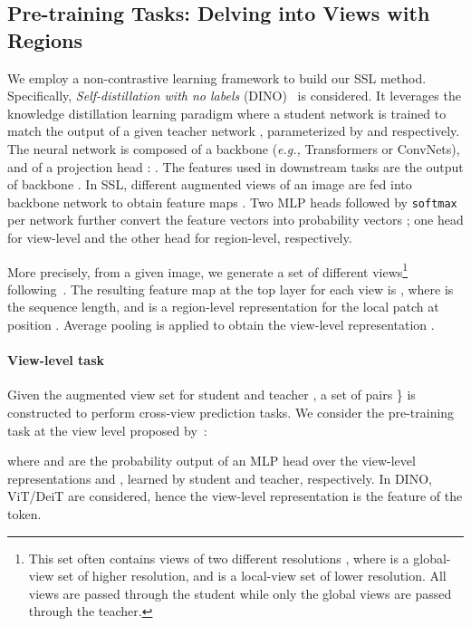 \documentclass{article} \usepackage{iclr2022_conference,times}
\newcommand{\eg}[0]{\emph{e.g., }}
\begin{document}
\subsection{Pre-training Tasks: Delving into Views with Regions}
\vspace{-2mm}
We employ a non-contrastive learning framework to build our SSL method. Specifically, {\em Self-distillation with no labels} (DINO)~\citep{caron2021emerging} is considered. It leverages the knowledge distillation learning paradigm where a student network  is trained
to match the output of a given teacher network 
, parameterized by  and  respectively. 
The neural network  is composed of a backbone  (\eg Transformers or ConvNets), and of a projection head : . The features used in downstream tasks are the output of backbone .
In SSL, different augmented views  of an image  are fed into backbone network to obtain feature maps . Two MLP heads followed by \texttt{softmax} per network further convert the feature vectors  into probability vectors ; one head for view-level and the other head for region-level, respectively.  

More precisely, from a given image, we generate a set  of different views\footnote{This set often contains views of two different resolutions , where  is a global-view set of higher resolution, and   is a local-view set of lower resolution. All views   are passed through the student while only the global views  are passed through the teacher.} following~\citep{caron2021emerging}. 
The resulting feature map at the top layer for each view is , where  is the sequence length, and  is a region-level representation for the local patch at position . Average pooling is applied to obtain the view-level representation .  


\paragraph{View-level task}
Given the augmented view set for student  and teacher , a set of pairs  \} is constructed to perform cross-view prediction tasks. We consider the pre-training task at the view level proposed by~\citep{caron2021emerging}:

where 
 and  are the probability output of an MLP head  over the view-level representations  and , learned by student and teacher, respectively. In DINO, ViT/DeiT are considered, hence the view-level representation is the feature of the  token.
\end{document}
